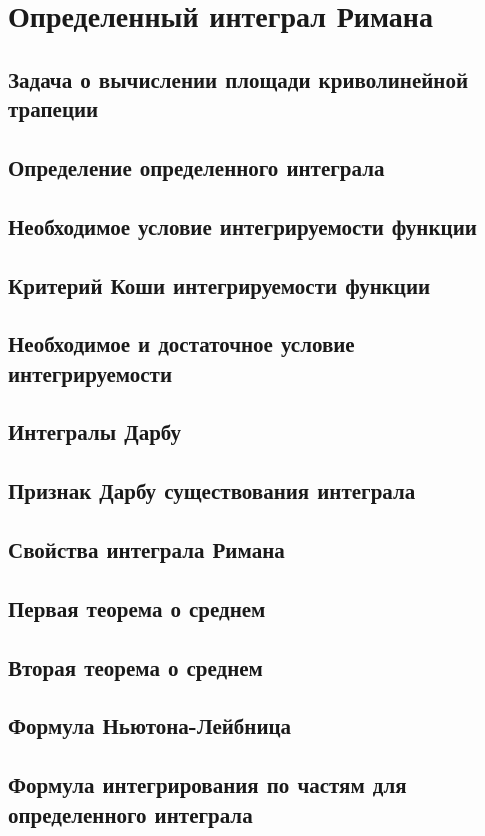 \section{Определенный интеграл Римана}
\subsection{Задача о вычислении площади криволинейной трапеции}
\subsection{Определение определенного интеграла}
\subsection{Необходимое условие интегрируемости функции}
\subsection{Критерий Коши интегрируемости функции}
\subsection{Необходимое и достаточное условие интегрируемости}
\subsection{Интегралы Дарбу}
\subsection{Признак Дарбу существования интеграла}
\subsection{Свойства интеграла Римана}
\subsection{Первая теорема о среднем}
\subsection{Вторая теорема о среднем} 
\subsection{Формула Ньютона-Лейбница}
\subsection{Формула интегрирования по частям для определенного интеграла}
